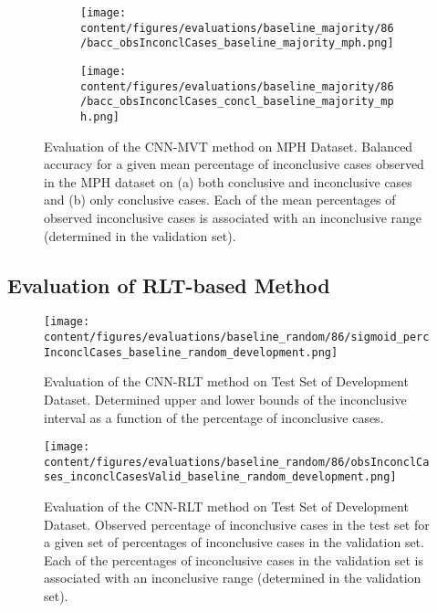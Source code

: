 \begin{figure}[t]
\begin{subfigure}{0.9\textwidth}
  \centering
  \texttt{[image: content/figures/evaluations/baseline\_majority/86/bacc\_obsInconclCases\_baseline\_majority\_mph.png]}
  \subcaption{}
  \label{fig:bacc_obsInconclCases_baseline_majority_mph}
\end{subfigure}
\hfill
\begin{subfigure}{0.9\textwidth}
  \centering
  \texttt{[image: content/figures/evaluations/baseline\_majority/86/bacc\_obsInconclCases\_concl\_baseline\_majority\_mph.png]}
  \subcaption{}
  \label{fig:bacc_obsInconclCases_concl_baseline_majority_mph}
\end{subfigure}

\caption{Evaluation of the CNN-MVT method on MPH Dataset.
Balanced accuracy for a given mean percentage of inconclusive cases observed in the MPH dataset on 
(a) both conclusive and inconclusive cases and (b) only conclusive cases. 
Each of the mean percentages of observed inconclusive cases is associated 
with an inconclusive range (determined in the validation set). }
\label{fig:bacc_obsInconclCases_baseline_majority_mph_full}
\end{figure}


\subsection{Evaluation of RLT-based Method}
\label{subsec:eval_rlt}




\begin{figure}[t]
  \centering
  \texttt{[image: content/figures/evaluations/baseline\_random/86/sigmoid\_percInconclCases\_baseline\_random\_development.png]}
  \caption{Evaluation of the CNN-RLT method on Test Set of Development Dataset. 
  Determined upper and lower bounds of the inconclusive interval as a function of the percentage of inconclusive cases.} 
  \label{fig:baseline_random_percInconclCases_development}
\end{figure}


\begin{figure}[h]
  \centering
  \texttt{[image: content/figures/evaluations/baseline\_random/86/obsInconclCases\_inconclCasesValid\_baseline\_random\_development.png]}
  \caption{Evaluation of the CNN-RLT method on Test Set of Development Dataset.
  Observed percentage of inconclusive cases in the test set 
  for a given set of percentages of inconclusive cases in the validation set.
  Each of the percentages of inconclusive cases in the validation set is associated 
  with an inconclusive range (determined in the validation set).} 
  \label{fig:obsInconclCases_inconclCasesValid_baseline_random_development}
\end{figure} 



